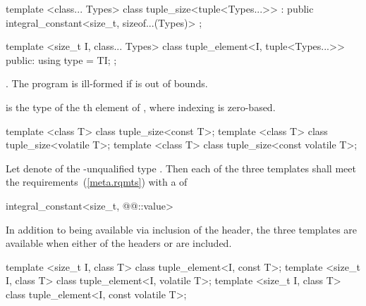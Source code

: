 %
\begin{itemdecl}
template <class... Types>
class tuple_size<tuple<Types...>>
  : public integral_constant<size_t, sizeof...(Types)> { };
\end{itemdecl}

%
\begin{itemdecl}
template <size_t I, class... Types>
class tuple_element<I, tuple<Types...>> {
public:
  using type = TI;
};
\end{itemdecl}

\begin{itemdescr}
\pnum
\requires {}.
The program is ill-formed if  is out of bounds.

\pnum
\ctype {} is the
type of the th element of ,
where indexing is zero-based.
\end{itemdescr}

%
\begin{itemdecl}
template <class T> class tuple_size<const T>;
template <class T> class tuple_size<volatile T>;
template <class T> class tuple_size<const volatile T>;
\end{itemdecl}

\begin{itemdescr}
\pnum
Let  denote  of the \cv-unqualified type . Then each
of the three templates shall meet the  requirements~(\ref{meta.rqmts})
with a  of
\begin{codeblock}
integral_constant<size_t, @@::value>
\end{codeblock}

\pnum
In addition to being available via inclusion of the  header,
the three templates are available when either of the headers  or
 are included.
\end{itemdescr}

%
\begin{itemdecl}
template <size_t I, class T> class tuple_element<I, const T>;
template <size_t I, class T> class tuple_element<I, volatile T>;
template <size_t I, class T> class tuple_element<I, const volatile T>;
\end{itemdecl}

